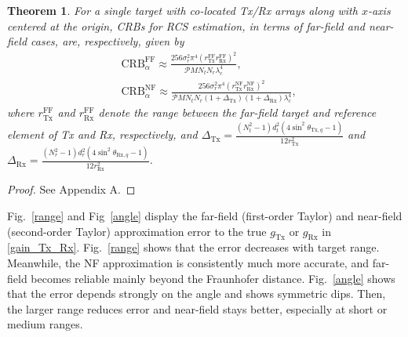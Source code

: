 \documentclass[9pt,final,journal,twocolumn]{IEEEtran}
\newtheorem{theorem}{Theorem}
\begin{document}
\begin{theorem}
 For a single target with co-located Tx/Rx arrays along with $x$-axis centered at the origin, CRBs for RCS estimation, in terms of far-field and near-field cases, are, respectively, given by
\begin{subequations} \label{CRB_RCS.1}
\begin{flalign} 
&\mathrm{CRB}_{\alpha}^{\mathrm{FF}}  \approx \frac{256\sigma_r^2\pi^{4}(r_{\mathrm{Tx}}^{\mathrm{FF}}r_{\mathrm{Rx}}^{\mathrm{FF}})^2}{\mathcal{P}M{N_t}{N_r}\lambda_c^4}, \label{CRB_RCS.1.1}\\
&\mathrm{CRB}_{\alpha}^{\mathrm{NF}} \! \approx \!\frac{256\sigma_r^2\pi^{4}(r_{\mathrm{Tx}}^{\mathrm{NF}}r_{\mathrm{Rx}}^{\mathrm{NF}})^2}{\mathcal{P}M{N_t}{N_r}(1+\Delta_{\mathrm{Tx}})(1+\Delta_{\mathrm{Rx}})\lambda_c^4}, \label{CRB_RCS.1.2}
\end{flalign} 
\end{subequations}
where  $r_{\mathrm{Tx}}^{\mathrm{FF}}$ and $r_{\mathrm{Rx}}^{\mathrm{FF}}$ denote the range between the far-field target and reference element of Tx and Rx, respectively, and $\Delta_{\mathrm{Tx}}=\frac{(N_t^{2}-1)d_t^2(4\sin^2\theta_{\mathrm{Tx},q} - 1)}{12 r_{\mathrm{Tx}}^2}$ and $\Delta_{\mathrm{Rx}}=\frac{(N_r^{2}-1)d_r^2(4\sin^2\theta_{\mathrm{Rx},q} - 1)}{12 r_{\mathrm{Rx}}^2}$. 
\end{theorem}
\begin{proof}
  See Appendix A. 
\end{proof}

Fig.~\ref{range} and Fig~\ref{angle} display the far-field (first-order Taylor) and near-field (second-order Taylor) approximation error to the true $g_{\mathrm {Tx}}$ or $g_{\mathrm {Rx}}$ in \eqref{gain_Tx_Rx}. Fig.~\ref{range} shows that the error decreases with target range. Meanwhile, the NF approximation is consistently much more accurate, and far-field becomes reliable mainly beyond the Fraunhofer distance. Fig.~\ref{angle} shows that the error depends strongly on the angle and shows symmetric dips. Then, the larger range reduces error and near-field stays better, especially at short or medium ranges.
%
\end{document}

